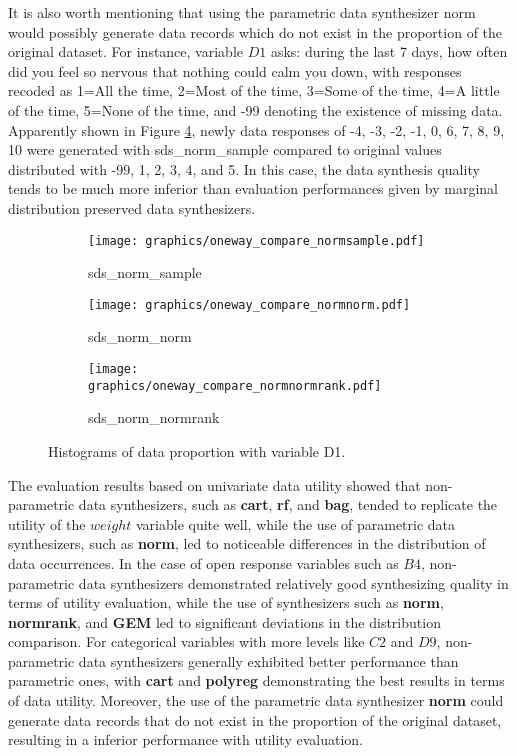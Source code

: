 It is also worth mentioning that using the parametric data synthesizer norm would possibly generate data records which do not exist in the proportion of the original dataset. For instance, variable $D1$ asks: during the last 7 days, how often did you feel so nervous that nothing could calm you down, with responses recoded as 1=All the time, 2=Most of the time, 3=Some of the time, 4=A little of the time, 5=None of the time, and -99 denoting the existence of missing data. Apparently shown in Figure \ref{fig:D1}, newly data responses of -4, -3, -2, -1, 0, 6, 7, 8, 9, 10 were generated with sds\_norm\_sample compared to original values distributed with -99, 1, 2, 3, 4, and 5. In this case, the data synthesis quality tends to be much more inferior than evaluation performances given by marginal distribution preserved data synthesizers.
\begin{figure}[H]
    \centering
    \begin{subfigure}{0.32\textwidth}
        \centering
        \texttt{[image: graphics/oneway\_compare\_normsample.pdf]}  
        \caption{sds\_norm\_sample}
        \label{subfig:normsampleD1}
    \end{subfigure}
    \begin{subfigure}{0.32\textwidth}
        \centering
        \texttt{[image: graphics/oneway\_compare\_normnorm.pdf]}  
        \caption{sds\_norm\_norm}
        \label{subfig:normnormD1}
    \end{subfigure}
    \begin{subfigure}{0.32\textwidth}
        \centering
        \texttt{[image: graphics/oneway\_compare\_normnormrank.pdf]}
        \caption{sds\_norm\_normrank}
        \label{subfig:normnormrankD1}
    \end{subfigure}
    \caption{Histograms of data proportion with variable D1.}
    \label{fig:D1}
\end{figure}
The evaluation results based on univariate data utility showed that non-parametric data synthesizers, such as \textbf{cart}, \textbf{rf}, and \textbf{bag}, tended to replicate the utility of the $weight$ variable quite well, while the use of parametric data synthesizers, such as \textbf{norm}, led to noticeable differences in the distribution of data occurrences. In the case of open response variables such as $B4$, non-parametric data synthesizers demonstrated relatively good synthesizing quality in terms of utility evaluation, while the use of synthesizers such as \textbf{norm}, \textbf{normrank}, and \textbf{GEM} led to significant deviations in the distribution comparison. For categorical variables with more levels like $C2$ and $D9$, non-parametric data synthesizers generally exhibited better performance than parametric ones, with \textbf{cart} and \textbf{polyreg} demonstrating the best results in terms of data utility. Moreover, the use of the parametric data synthesizer \textbf{norm} could generate data records that do not exist in the proportion of the original dataset, resulting in a inferior performance with utility evaluation. 

